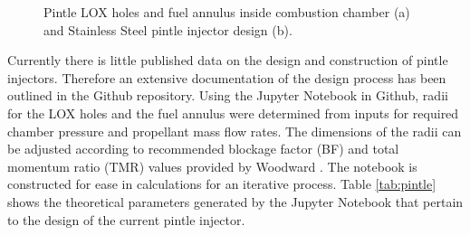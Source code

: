 \documentclass[]{aiaa-tc}%
\begin{document}
\begin{figure}
\centering
    \caption{Pintle LOX holes and fuel annulus inside combustion chamber (a) and Stainless Steel pintle injector design (b).}
    \label{fig:PIxsection}
\end{figure}

Currently there is little published data on the design and construction of pintle injectors. Therefore an extensive documentation of the design process has been outlined in the Github repository. Using the Jupyter Notebook in Github, radii for the LOX holes and the fuel annulus were determined from inputs for required chamber pressure and propellant mass flow rates. The dimensions of the radii can be adjusted according to recommended blockage factor (BF) and total momentum ratio (TMR) values provided by Woodward \cite{woodward1998injector}. The notebook is constructed for ease in calculations for an iterative process. Table \ref{tab:pintle} shows the theoretical parameters generated by the Jupyter Notebook that pertain to the design of the current pintle injector.
\end{document}
